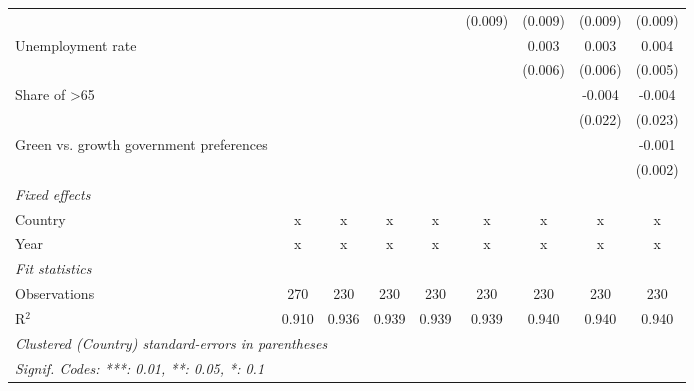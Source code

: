 \begin{table}[htbp]
\begin{tabular}{lcccccccc}
                                                            &         &         &               &               & (0.009)       & (0.009)       & (0.009)        & (0.009)\\   
      Unemployment rate                                     &         &         &               &               &               & 0.003         & 0.003          & 0.004\\   
                                                            &         &         &               &               &               & (0.006)       & (0.006)        & (0.005)\\   
      Share of >65                                          &         &         &               &               &               &               & -0.004         & -0.004\\   
                                                            &         &         &               &               &               &               & (0.022)        & (0.023)\\   
      Green vs. growth government preferences               &         &         &               &               &               &               &                & -0.001\\   
                                                            &         &         &               &               &               &               &                & (0.002)\\   
      \emph{Fixed effects}\\
      Country                                               & x       & x       & x             & x             & x             & x             & x              & x\\  
      Year                                                  & x       & x       & x             & x             & x             & x             & x              & x\\  
      \midrule \emph{Fit statistics}\\
      Observations                                          & 270     & 230     & 230           & 230           & 230           & 230           & 230            & 230\\  
      R$^2$                                                 & 0.910   & 0.936   & 0.939         & 0.939         & 0.939         & 0.940         & 0.940          & 0.940\\  
      \midrule
      \multicolumn{9}{l}{\emph{Clustered (Country) standard-errors in parentheses}}\\
      \multicolumn{9}{l}{\emph{Signif. Codes: ***: 0.01, **: 0.05, *: 0.1}}\\
   \end{tabular}
\end{table}


